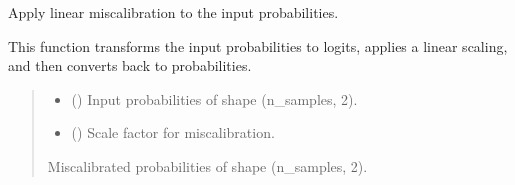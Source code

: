 \documentclass[letterpaper,10pt,english]{sphinxmanual}
\begin{document}
\begin{fulllineitems}

\begin{fulllineitems}
\label{\detokenize{calzone:calzone.utils.fake_binary_data_generator.linear_miscal}}
\pysigstartsignatures
{}
\pysigstopsignatures
\sphinxAtStartPar
Apply linear miscalibration to the input probabilities.

\sphinxAtStartPar
This function transforms the input probabilities to logits,
applies a linear scaling, and then converts back to probabilities.
\begin{quote}\begin{description}
\begin{itemize}
\item {} 
\sphinxAtStartPar
{} () \textendash{} Input probabilities of shape (n\_samples, 2).

\item {} 
\sphinxAtStartPar
{} () \textendash{} Scale factor for miscalibration.

\end{itemize}

\sphinxAtStartPar
{} \textendash{} Miscalibrated probabilities of shape (n\_samples, 2).

\end{description}\end{quote}

\end{fulllineitems}


\end{fulllineitems}

\end{document}

